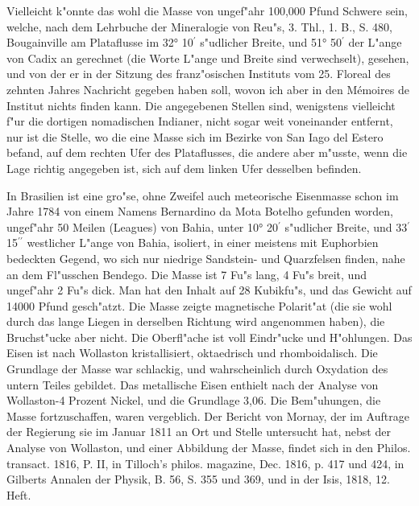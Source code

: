 \documentclass[a4paper, 11pt, oneside, polutonikogreek, german]{article}
\begin{document}
Vielleicht k"onnte das wohl die Masse von ungef"ahr 100,000 Pfund Schwere sein, welche, nach dem Lehrbuche der Mineralogie von Reu"s, 3. Thl., 1. B., S. 480, Bougainville am Plataflusse im 32° 10$^{\prime}$ s"udlicher Breite, und 51° 50$^{\prime}$ der L"ange von Cadix an gerechnet (die Worte L"ange und Breite sind verwechselt), gesehen, und von der er in der Sitzung des franz"osischen Instituts vom 25. Floreal des zehnten Jahres Nachricht gegeben haben soll, wovon ich aber in den Mémoires de Institut nichts finden kann. Die angegebenen Stellen sind, wenigstens vielleicht f"ur die dortigen nomadischen Indianer, nicht sogar weit voneinander entfernt, nur ist die Stelle, wo die eine Masse sich im Bezirke von San Iago del Estero befand, auf dem rechten Ufer des Plataflusses, die andere aber m"usste, wenn die Lage richtig angegeben ist, sich auf dem linken Ufer desselben befinden.

In Brasilien ist eine gro"se, ohne Zweifel auch meteorische Eisenmasse schon im Jahre 1784 von einem Namens Bernardino da Mota Botelho gefunden worden, ungef"ahr 50 Meilen (Leagues) von Bahia, unter 10° 20$^{\prime}$ s"udlicher Breite, und 33$^{\prime}$ 15$^{\prime\prime}$ westlicher L"ange von Bahia, isoliert, in einer meistens mit Euphorbien bedeckten Gegend, wo sich nur niedrige Sandstein- und Quarzfelsen finden, nahe an dem Fl"usschen Bendego. Die Masse ist 7 Fu"s lang, 4 Fu"s breit, und ungef"ahr 2 Fu"s dick. Man hat den Inhalt auf 28 Kubikfu"s, und das Gewicht auf 14000 Pfund gesch"atzt. Die Masse zeigte magnetische Polarit"at (die sie wohl durch das lange Liegen in derselben Richtung wird angenommen haben), die Bruchst"ucke aber nicht. Die Oberfl"ache ist voll Eindr"ucke und H"ohlungen. Das Eisen ist nach Wollaston kristallisiert, oktaedrisch und rhomboidalisch. Die Grundlage der Masse war schlackig, und wahrscheinlich durch Oxydation des untern Teiles gebildet. Das metallische Eisen enthielt nach der Analyse von Wollaston-4 Prozent Nickel, und die Grundlage 3,06. Die Bem"uhungen, die Masse fortzuschaffen, waren vergeblich. Der Bericht von Mornay, der im Auftrage der Regierung sie im Januar 1811 an Ort und Stelle untersucht hat, nebst der Analyse von Wollaston, und einer Abbildung der Masse, findet sich in den Philos. transact. 1816, P. II, in Tilloch's philos. magazine, Dec. 1816, p. 417 und 424, in Gilberts Annalen der Physik, B. 56, S. 355 und 369, und in der Isis, 1818, 12. Heft.
\end{document}
